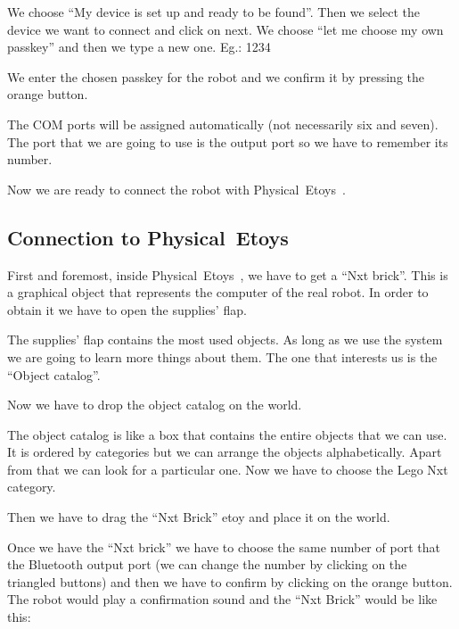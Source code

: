 \documentclass[english]{etoys-guide}
\def\appName{Physical~Etoys~}
\begin{document}



We choose “My device is set up and ready to be found”. Then we select the
device we want to connect and click on next. We choose “let me choose my own
passkey” and then we type a new one. Eg.: 1234



We enter the chosen passkey for the robot and we confirm it by pressing the
orange button. 



The COM ports will be assigned automatically (not necessarily six and seven).
The port that we are going to use is the output port so we have to remember its
number. 



Now we are ready to connect the robot with \appName. 

\subsection{Connection to \appName}

First and foremost, inside \appName, we have to get a “Nxt brick”. This is a
graphical object that represents the computer of the real robot. In order to
obtain it we have to open the supplies’ flap.



The supplies’ flap contains the most used objects.  As long as we use the
system we are going to learn more things about them. The one that interests us
is the “Object catalog”.



Now we have to drop the object catalog on the world. 



The object catalog is like a box that contains the entire objects that we can
use. It is ordered by categories but we can arrange the objects alphabetically.
Apart from that we can look for a particular one. Now we have to choose the
Lego Nxt category. 



Then we have to drag the “Nxt Brick” etoy and place it on the world.




Once we have the “Nxt brick” we have to choose the same number of port that the
Bluetooth output port (we can change the number by clicking on the triangled
buttons) and then we have to confirm by clicking on the orange button. The
robot would play a confirmation sound and the “Nxt Brick” would be like this:
\end{document}
